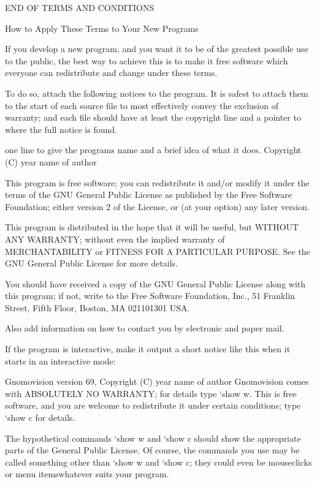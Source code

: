 \documentclass[letterpaper,10pt,english]{sphinxmanual}
\begin{document}
\begin{sphinxVerbatim}[commandchars=\\\{\}]
                     END OF TERMS AND CONDITIONS

            How to Apply These Terms to Your New Programs

  If you develop a new program, and you want it to be of the greatest
possible use to the public, the best way to achieve this is to make it
free software which everyone can redistribute and change under these terms.

  To do so, attach the following notices to the program.  It is safest
to attach them to the start of each source file to most effectively
convey the exclusion of warranty; and each file should have at least
the \PYGZdq{}copyright\PYGZdq{} line and a pointer to where the full notice is found.

    \PYGZlt{}one line to give the program\PYGZsq{}s name and a brief idea of what it does.\PYGZgt{}
    Copyright (C) \PYGZlt{}year\PYGZgt{}  \PYGZlt{}name of author\PYGZgt{}

    This program is free software; you can redistribute it and/or modify
    it under the terms of the GNU General Public License as published by
    the Free Software Foundation; either version 2 of the License, or
    (at your option) any later version.

    This program is distributed in the hope that it will be useful,
    but WITHOUT ANY WARRANTY; without even the implied warranty of
    MERCHANTABILITY or FITNESS FOR A PARTICULAR PURPOSE.  See the
    GNU General Public License for more details.

    You should have received a copy of the GNU General Public License along
    with this program; if not, write to the Free Software Foundation, Inc.,
    51 Franklin Street, Fifth Floor, Boston, MA 02110\PYGZhy{}1301 USA.

Also add information on how to contact you by electronic and paper mail.

If the program is interactive, make it output a short notice like this
when it starts in an interactive mode:

    Gnomovision version 69, Copyright (C) year name of author
    Gnomovision comes with ABSOLUTELY NO WARRANTY; for details type {}`show w\PYGZsq{}.
    This is free software, and you are welcome to redistribute it
    under certain conditions; type {}`show c\PYGZsq{} for details.

The hypothetical commands {}`show w\PYGZsq{} and {}`show c\PYGZsq{} should show the appropriate
parts of the General Public License.  Of course, the commands you use may
be called something other than {}`show w\PYGZsq{} and {}`show c\PYGZsq{}; they could even be
mouse\PYGZhy{}clicks or menu items\PYGZhy{}\PYGZhy{}whatever suits your program.


\end{sphinxVerbatim}
\end{document}
